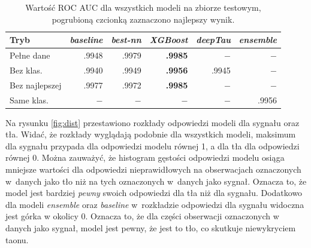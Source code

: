 \documentclass{pracalicmgr}
\begin{document}
	
	\begin{table}[H]
	\centering
	\caption{Wartość ROC AUC dla wszystkich modeli na zbiorze testowym, pogrubioną czcionką zaznaczono najlepszy wynik.}
	\label{tab:wyniki}
	\begin{tabular}{lrrrrr}
	\toprule
	Tryb & \textit{baseline} & \textit{best-nn} & \textit{XGBoost} & \textit{deepTau} & \textit{ensemble} \\
	\midrule
	Pełne dane & .9948 & .9979 & \textbf{.9985} & $-$ & $-$ \\
	Bez klas. & .9940 & .9949 & \textbf{.9956} & .9945 & $-$  \\
	Bez najlepszej & .9977 & .9972 & \textbf{.9985} & $-$ & $-$ \\
	Same klas. & $-$ & $-$ & $-$ & $-$ & .9956 \\
	\bottomrule
	\end{tabular}
	\end{table}
	
	Na rysunku \ref{fig:dist} przestawiono rozkłady odpowiedzi modeli dla sygnału oraz tła. Widać, że rozkłady wyglądają podobnie dla wszystkich modeli, maksimum dla sygnału przypada dla odpowiedzi modelu równej 1, a dla tła dla odpowiedzi równej 0. Można zauważyć, że histogram gęstości odpowiedzi modelu osiąga mniejsze wartości dla odpowiedzi nieprawidłowych na obserwacjach oznaczonych w~danych jako tło niż na tych oznaczonych w~danych jako sygnał. Oznacza to, że model jest bardziej \textit{pewny} swoich odpowiedzi dla tła niż dla sygnału. Dodatkowo dla modeli \textit{ensemble} oraz \textit{baseline} w~rozkładzie odpowiedzi dla sygnału widoczna jest górka w okolicy 0. Oznacza to, że dla części obserwacji oznaczonych w danych jako sygnał, model jest pewny, że jest to tło, co skutkuje niewykryciem taonu.
\end{document}
